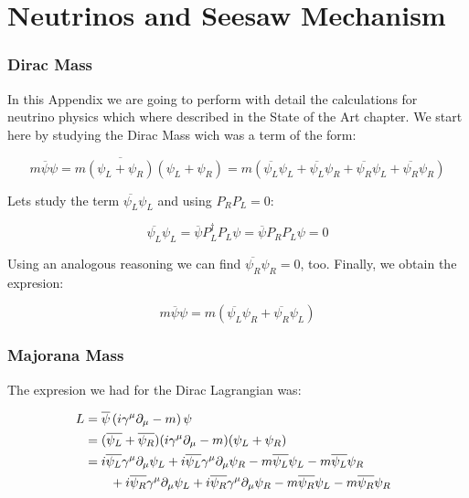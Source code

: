 \chapter{Neutrinos and Seesaw Mechanism} \label{apendice_neutrinos}


\subsection{Dirac Mass}
In this Appendix we are going to perform with detail the calculations for neutrino physics which where described in the State of the Art chapter. 
We start here by studying the Dirac Mass wich was a term of the form:

\begin{equation}
 m \overline{\psi} \psi = m \overline{(\psi_L + \psi_R)} (\psi_L + \psi_R) = m(\overline{\psi_L} \psi_L + \overline{\psi_L}\psi_R + \overline{\psi_R}\psi_L + \overline{\psi_R} \psi_R)
\end{equation}

Lets study the term $\overline{\psi_L}\psi_L$ and using $P_R  P_L = 0$:

\begin{equation}
 \overline{\psi_L}\psi_L = \overline{\psi} {P}^{\dagger}_L P_L \psi = \overline{\psi}P_R  P_L \psi = 0
\end{equation}

Using an analogous reasoning we can find $\overline{\psi_R}\psi_R = 0$, too. Finally, we obtain the expresion:

\begin{equation}
  m \overline{\psi} \psi = m (\overline{\psi_L} \psi_R + \overline{\psi_R}\psi_L)
\end{equation}

\subsection{Majorana Mass}

The expresion we had for the Dirac Lagrangian was: 

\begin{align}
  &\begin{aligned}
    \mathllap{L} &= \overline{\psi} \left( i \gamma ^\mu \partial_{\mu} - m \right) \psi \\
    \mathllap{}  &= (\overline{\psi_L} + \overline{\psi_R})( i \gamma ^\mu \partial_{\mu} - m)(\psi_L + \psi_R) \\
    \mathllap{}  &= i \overline{\psi_L} \gamma ^\mu \partial_{\mu} \psi_L + i \overline{\psi_L} \gamma ^\mu   \partial_{\mu} \psi_R - m \overline{\psi_L} \psi_L - m \overline{\psi_L} \psi_R \\
  &\qquad + i \overline{\psi_R} \gamma ^\mu \partial_{\mu} \psi_L + i \overline{\psi_R} \gamma^{\mu} \partial_{\mu} \psi_R - m \overline{\psi_R} \psi_L - m \overline{\psi_R} \psi_R \\
  \end{aligned}\\
\end{align}

